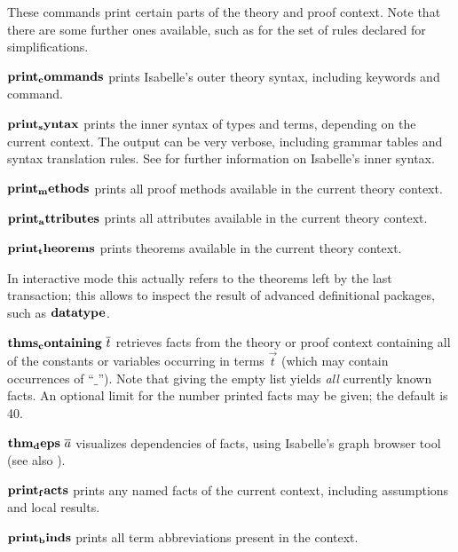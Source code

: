 These commands print certain parts of the theory and proof context.  Note that
there are some further ones available, such as for the set of rules declared
for simplifications.

\begin{descr}
  
\item [${\mathord{\mathbf{print_commands}}}$] prints Isabelle's outer theory syntax,
  including keywords and command.
  
\item [${\mathord{\mathbf{print_syntax}}}$] prints the inner syntax of types and
  terms, depending on the current context.  The output can be very verbose,
  including grammar tables and syntax translation rules.  See \cite[\S7,
  \S8]{isabelle-ref} for further information on Isabelle's inner syntax.
  
\item [${\mathord{\mathbf{print_methods}}}$] prints all proof methods available in
  the current theory context.
  
\item [${\mathord{\mathbf{print_attributes}}}$] prints all attributes available in
  the current theory context.
  
\item [${\mathord{\mathbf{print_theorems}}}$] prints theorems available in the
  current theory context.
  
  In interactive mode this actually refers to the theorems left by the last
  transaction; this allows to inspect the result of advanced definitional
  packages, such as ${\mathord{\mathbf{datatype}}}$.
  
\item [${\mathord{\mathbf{thms_containing}}}~\overline{t}$] retrieves facts from the theory
  or proof context containing all of the constants or variables occurring in
  terms $\vec t$ (which may contain occurrences of ``$\_$'').  Note that
  giving the empty list yields \emph{all} currently known facts.  An optional
  limit for the number printed facts may be given; the default is 40.
  
\item [${\mathord{\mathbf{thm_deps}}}~\overline{a}$] visualizes dependencies of facts,
  using Isabelle's graph browser tool (see also \cite{isabelle-sys}).
  
\item [${\mathord{\mathbf{print_facts}}}$] prints any named facts of the current
  context, including assumptions and local results.
  
\item [${\mathord{\mathbf{print_binds}}}$] prints all term abbreviations present in
  the context.

\end{descr}


